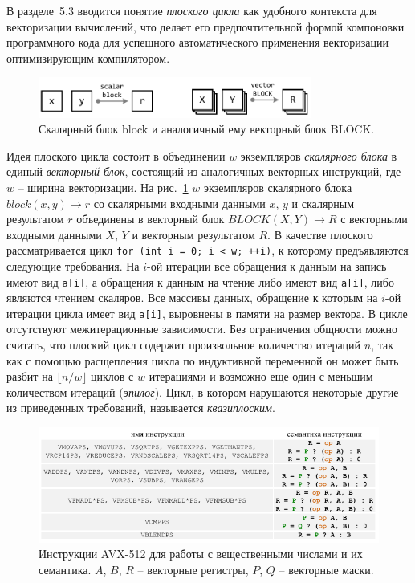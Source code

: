 \documentclass[a4paper,14pt]{extarticle}                     %
\theoremstyle{plain}                                         %
\begin{document}

В разделе~5.3 вводится понятие \textit{плоского цикла} как удобного контекста для векторизации вычислений, что делает его предпочтительной формой компоновки программного кода для успешного автоматического применения векторизации оптимизирующим компилятором.

\begin{figure}[ht]
\centering
\includegraphics[width=0.8\textwidth]{./fig/vec_block_BLOCK.pdf}
\singlespacing
\caption{Скалярный блок block и аналогичный ему векторный блок BLOCK.}
\label{fig:vec_block_BLOCK}
\end{figure}

Идея плоского цикла состоит в объединении $w$ экземпляров \textit{скалярного блока} в единый \textit{векторный блок}, состоящий из аналогичных векторных инструкций, где $w$ -- ширина векторизации.
На рис.~\ref{fig:vec_block_BLOCK} $w$ экземпляров скалярного блока $block(x, y) \rightarrow r$ со скалярными входными данными $x$, $y$ и скалярным результатом $r$ объединены в векторный блок $BLOCK(X, Y) \rightarrow R$ с векторными входными данными $X$, $Y$ и векторным результатом $R$.
В качестве плоского рассматривается цикл \texttt{for (int i = 0; i < w; ++i)}, к которому предъявляются следующие требования.
На $i$-ой итерации все обращения к данным на запись имеют вид \texttt{a[i]}, а обращения к данным на чтение либо имеют вид \texttt{a[i]}, либо являются чтением скаляров.
Все массивы данных, обращение к которым на $i$-ой итерации цикла имеет вид \texttt{a[i]}, выровнены в памяти на размер вектора.
В цикле отсутствуют межитерационные зависимости.
Без ограничения общности можно считать, что плоский цикл содержит произвольное количество итераций $n$, так как с помощью расщепления цикла по индуктивной переменной он может быть разбит на $\lfloor n/w \rfloor$ циклов с $w$ итерациями и возможно еще один с меньшим количеством итераций (\textit{эпилог}).
Цикл, в котором нарушаются некоторые другие из приведенных требований, называется \textit{квазиплоским}.

\begin{figure}[!ht]
\centering
\includegraphics[width=1.0\textwidth]{./fig/vec_avx512_semantic_table.pdf}
\singlespacing
\caption{Инструкции AVX-512 для работы с вещественными числами и их семантика. $A$, $B$, $R$ -- векторные регистры, $P$, $Q$ -- векторные маски.}
\label{fig:vec_avx512_semantic_table}
\end{figure}
\end{document}
